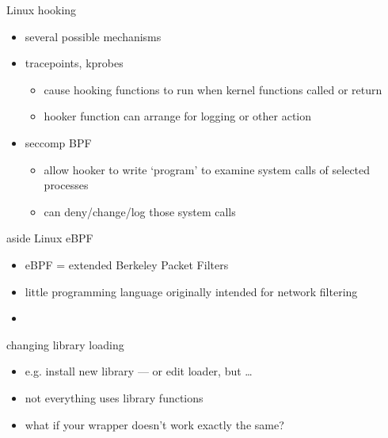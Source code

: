 \begin{frame}{Linux hooking}
\begin{itemize}
\item several possible mechanisms
\item tracepoints, kprobes
    \begin{itemize}
    \item cause hooking functions to run when kernel functions called or return
    \item hooker function can arrange for logging or other action
    \end{itemize}
\item seccomp BPF
    \begin{itemize}
    \item allow hooker to write `program' to examine system calls of selected processes
    \item can deny/change/log those system calls
    \end{itemize}
\end{itemize}
\end{frame}

\begin{frame}{aside Linux eBPF}
    \begin{itemize}
    \item eBPF = extended Berkeley Packet Filters
    \item little programming language originally intended for network filtering
    \item 
    \end{itemize}
\end{frame}


\begin{frame}{changing library loading}
\begin{itemize}
    \item e.g. install new library --- or edit loader, but \ldots
    \vspace{.5cm}
    \item not everything uses library functions
    \item what if your wrapper doesn't work exactly the same?
\end{itemize}
\end{frame}


